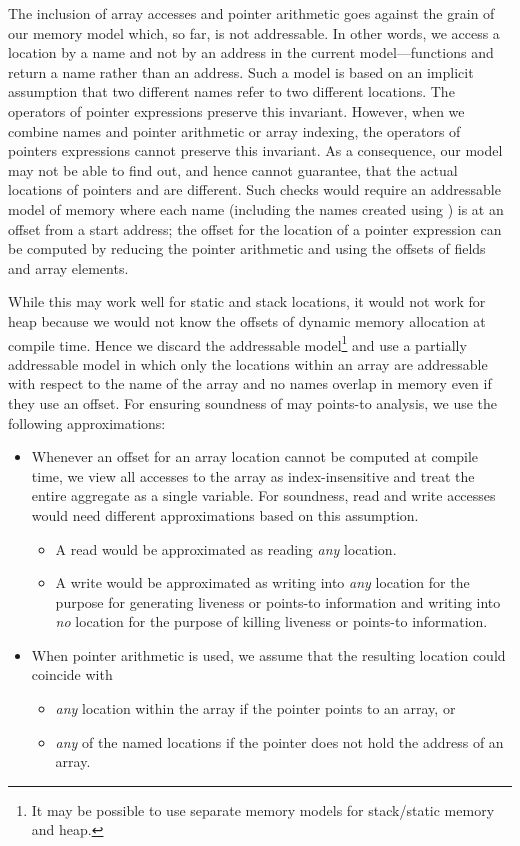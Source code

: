 \documentclass[a4paper,11pt,fleqn]{article}
\begin{document}
The inclusion of array accesses and pointer arithmetic goes
against the grain of our memory model which, so far, is not addressable.
In other words, we access a location by a name and not by an address
in the current model---functions \lval and \rval return a name rather than
an address. Such a model is based on an implicit assumption that two
different names refer to two different locations. The operators of
pointer expressions preserve this invariant. However, when we combine
names and pointer arithmetic or array indexing, the operators of
pointers expressions cannot preserve this invariant. As a consequence,
our model may not be able to find out, and hence cannot guarantee, that
the actual locations of pointers  and  are different. Such
checks would require an addressable model of memory where each name
(including the names created using \lval) is at an offset from a start
address; the offset for the location of a pointer expression can be
computed by reducing the pointer arithmetic and using the offsets of
fields and array elements.

While this may work well for static and stack locations, it would
not work for heap because we would not know the offsets of dynamic
memory allocation at compile time. Hence we discard the addressable
model\footnote{It may be possible to use separate memory models for
stack/static memory and heap.} and use a partially addressable model in
which only the locations within an array are addressable with respect to
the name of the array and no names overlap in memory even if they use
an offset. For ensuring soundness of may points-to analysis, we use the
following approximations:
\begin{itemize}
\item Whenever an offset for an array location cannot be computed at
      compile time, we view all accesses to the array as index-insensitive and treat the
      entire aggregate as a single variable. For soundness, read and
      write accesses would need different approximations based on this
      assumption.
	\begin{itemize}
	\item A read would be approximated as reading {\em any\/} location. 
	\item A write would be approximated as writing into {\em any\/}
      location for the purpose for generating liveness or points-to information and
      writing into {\em no\/} location for the purpose of 
      killing liveness or points-to information.
	\end{itemize}
\item When pointer arithmetic is used, we assume that the resulting location could coincide
      with 
	\begin{itemize}
	\item {\em any\/} location within the array if the pointer points to an array, or
	\item {\em any\/} of the named locations if the pointer does not hold the address of an array.
	\end{itemize}
\end{itemize}
\end{document}
